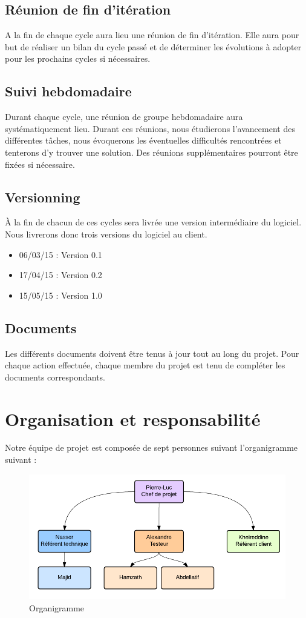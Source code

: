 \documentclass{../res/univ-projet}
\begin{document}
  \subsection{Réunion de fin d’itération}
    A la fin de chaque cycle aura lieu une réunion de fin d’itération. Elle aura pour but de réaliser un bilan du cycle passé et de déterminer les évolutions à adopter pour les prochains cycles si nécessaires.
  \subsection{Suivi hebdomadaire}
    Durant chaque cycle, une réunion de groupe hebdomadaire aura systématiquement lieu. Durant ces réunions, nous étudierons l’avancement des différentes tâches, nous évoquerons les éventuelles difficultés rencontrées et tenterons d’y trouver une solution. Des réunions supplémentaires pourront être fixées si nécessaire.
  \subsection{Versionning}
    À la fin de chacun de ces cycles sera livrée une version intermédiaire du logiciel. Nous livrerons donc trois versions du logiciel au client.
    \begin{itemize}
      \item 06/03/15 : Version 0.1
      \item 17/04/15 : Version 0.2
      \item 15/05/15 : Version 1.0
    \end{itemize}
  \subsection{Documents}
    Les différents documents doivent être tenus à jour tout au long du projet. Pour chaque action effectuée, chaque membre du projet est tenu de compléter les documents correspondants.
  \newpage
\section{Organisation et responsabilité}
Notre équipe de projet est composée de sept personnes suivant l’organigramme suivant :
 \begin{figure}[!h]
    \includegraphics[width=17.8cm]{fig/organigramme.png}
    \caption{Organigramme}
    \label{organigramme}
  \end{figure}
\end{document}
